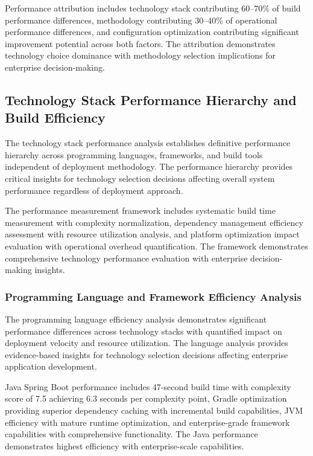 Performance attribution includes technology stack contributing 60--70\% of build performance differences, methodology contributing 30--40\% of operational performance differences, and configuration optimization contributing significant improvement potential across both factors. The attribution demonstrates technology choice dominance with methodology selection implications for enterprise decision-making.


\subsection{Technology Stack Performance Hierarchy and Build Efficiency}
\label{subsec:technology_performance}

The technology stack performance analysis establishes definitive performance hierarchy across programming languages, frameworks, and build tools independent of deployment methodology. The performance hierarchy provides critical insights for technology selection decisions affecting overall system performance regardless of deployment approach.

The performance measurement framework includes systematic build time measurement with complexity normalization, dependency management efficiency assessment with resource utilization analysis, and platform optimization impact evaluation with operational overhead quantification. The framework demonstrates comprehensive technology performance evaluation with enterprise decision-making insights.

\subsubsection{Programming Language and Framework Efficiency Analysis}

The programming language efficiency analysis demonstrates significant performance differences across technology stacks with quantified impact on deployment velocity and resource utilization. The language analysis provides evidence-based insights for technology selection decisions affecting enterprise application development.

Java Spring Boot performance includes 47-second build time with complexity score of 7.5 achieving 6.3 seconds per complexity point, Gradle optimization providing superior dependency caching with incremental build capabilities, JVM efficiency with mature runtime optimization, and enterprise-grade framework capabilities with comprehensive functionality. The Java performance demonstrates highest efficiency with enterprise-scale capabilities.

